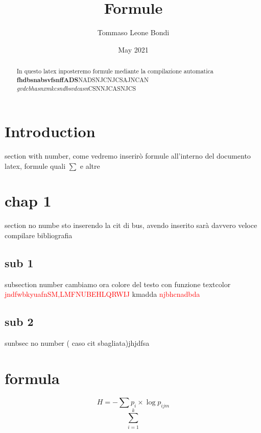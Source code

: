 \documentclass{article}
\title{Formule}
\author{Tommaso Leone Bondi }
\date{May 2021}
\newcommand{\rosso}{\textcolor{red}}
\begin{document}
\maketitle
\begin{abstract}
In questo latex inposteremo formule mediante la compilazione automatica
\textbf{fhdbsnabsvfsnffADS}NADSNJCNJCSAJNCAN
\textit{gvdcbhasnxmkcsndbsvdcasn}CSNNJCASNJCS
\end{abstract}

\section{Introduction}
section with number, come vedremo inserirò formule all'interno del documento latex, formule quali $\sum$ e altre
\section*{chap 1}
section no numbe
sto inserendo la cit di bus, avendo inserito \citep{brus et al.} sarà davvero veloce compilare bibliografia
\subsection{sub 1}
subsection number
cambiamo ora colore del testo con funzione textcolor
\textcolor{red}{jndfwbkyuafnSM,LMFNUBEHLQRWIJ} kmadda \rosso{njbhcnadbda}
\subsection*{sub 2}
sunbsec no number \citep{Adorno 1960} ( caso cit sbagliata)jhjdfsa
\section{formula}
\begin{equation}
H= - \sum  p_i \times  \log{p_{ijm}}
\label{equation}
\end{equation}
\begin{equation}
  \sum_{i=1}^{k} 
  \label{eqaution 2}
\end{equation}
\end{document}
